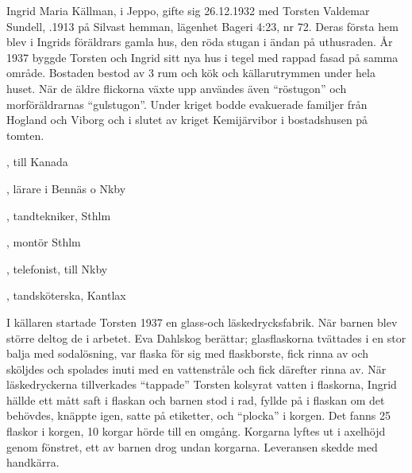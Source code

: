 %
\jhvspace{}


%
Ingrid Maria Källman,  i Jeppo, gifte sig 26.12.1932 med Torsten Valdemar Sundell, .1913 på Silvast hemman, lägenhet Bageri 4:23, nr 72. Deras första hem blev i Ingrids föräldrars gamla hus, den röda stugan i ändan på uthusraden. År 1937 byggde 	Torsten och Ingrid sitt nya hus i tegel med rappad fasad på samma område. Bostaden bestod av 3 rum och kök och källarutrymmen under hela huset. När de äldre flickorna växte upp användes även ``röstugon'' och morföräldrarnas ``gulstugon''. Under kriget bodde evakuerade 	familjer från Hogland och Viborg och i slutet av kriget Kemijärvibor i 	bostadshusen på tomten.
\begin{jhchildren}
  \item {}, till Kanada
  \item {}, lärare i Bennäs o Nkby
  \item {}, tandtekniker, Sthlm
  \item {}, montör Sthlm
  \item {}, telefonist, till Nkby
  \item {}, tandsköterska, Kantlax
  \item {}
\end{jhchildren}

I källaren startade Torsten 1937 en glass-och läskedrycksfabrik. När barnen blev större deltog de i arbetet. Eva Dahlskog berättar; glasflaskorna tvättades i en stor balja med sodalösning, var flaska för sig med flaskborste, fick rinna av och sköljdes och spolades inuti med en vattenstråle och fick därefter rinna av. När läskedryckerna tillverkades ``tappade'' Torsten kolsyrat vatten i flaskorna, Ingrid hällde ett mått saft i flaskan och barnen stod i rad, fyllde på i flaskan om det behövdes,	knäppte igen, satte på etiketter, och ``plocka'' i korgen. Det fanns 25 flaskor i korgen, 10 korgar hörde till en omgång. Korgarna lyftes ut i axelhöjd genom fönstret, ett av barnen drog undan korgarna. Leveransen 	skedde med handkärra.

